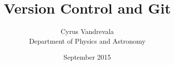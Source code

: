 



\title{Version Control and Git}
\subtitle{}
\author{Cyrus Vandrevala\\Department of Physics and Astronomy}
\date{September 2015}

















